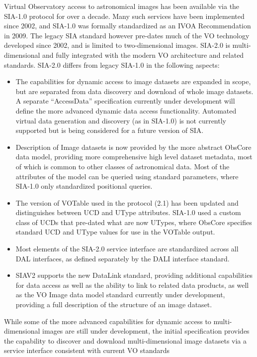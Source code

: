 \documentclass[11pt,a4paper]{ivoa}
\begin{document}
Virtual Observatory access to astronomical images has been available via the SIA-1.0 protocol for over a decade.  Many such services have been implemented since 2002, and SIA-1.0 \citep{2015ivoa.spec.1223D} was formally standardized as an IVOA Recommendation in 2009.  The legacy SIA standard however pre-dates much of the VO technology developed since 2002, and is limited to two-dimensional images.  SIA-2.0 is multi-dimensional and fully integrated with the modern VO architecture and related standards.
SIA-2.0 differs from legacy SIA-1.0 in the following aspects:
\begin{itemize}
    \item The capabilities for dynamic access to image datasets are expanded in scope, but are separated from data discovery and download of whole image datasets.  A separate “AccessData” specification currently under development will define the more advanced dynamic data access functionality.  Automated virtual data generation and discovery (as in SIA-1.0) is not currently supported but is being considered for a future version of SIA.
    \item Description of Image datasets is now provided by the more abstract ObsCore data model, providing more comprehensive high level dataset metadata, most of which is common to other classes of astronomical data. Most of the attributes of the model can be queried using standard parameters, where SIA-1.0 only standardized positional queries.
    \item The version of VOTable   used  in the protocol (2.1) has been updated  and distinguishes between UCD and UType attributes. SIA-1.0 used a custom class of UCDs that pre-dated what are now UTypes, where ObsCore specifies standard UCD and UType values for use in the VOTable output.
    \item Most elements of the SIA-2.0 service interface are standardized across all DAL interfaces, as defined separately by the DALI  interface standard.
    \item SIAV2  supports the new DataLink  standard, providing additional capabilities for data access as well as the ability to link to related data products, as well as the VO Image data model standard currently under development, providing a full description of the structure of an image dataset.
\end{itemize}
While some of the more advanced capabilities for dynamic access to multi-dimensional images are still under development, the initial specification provides the capability to discover and download multi-dimensional image datasets via a service interface consistent with current VO standards
\end{document}
